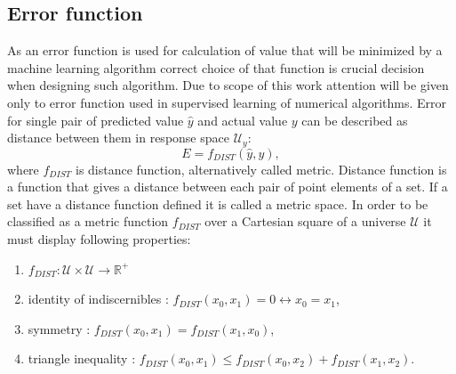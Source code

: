 \subsection{Error function}
As an error function is used for calculation of value that will be minimized by a machine 
learning algorithm correct choice of that function is crucial decision when designing such
algorithm.
Due to scope of this work attention will be given only to error function used in supervised 
learning of numerical algorithms.
Error for single pair of predicted value $\hat{y}$ and actual value $y$ can be described as
distance between them in response space $\mathcal{U}_{y}$:
\begin{equation}
	\label{equ:dist_general}
	E = f_{DIST}(\hat{y},y),
\end{equation}
where $f_{DIST}$ is distance function, alternatively called metric.
Distance function is a function that gives a distance between each pair of point elements of a set.
If a set have a distance function defined it is called a metric space. 
In order to be classified as a metric function $f_{DIST}$ over a Cartesian square of a universe 
$\mathcal{U}$ it must display following properties:
\begin{enumerate}
	\item $f_{DIST} : \mathcal{U} \times \mathcal{U} \to \mathbb{R}^{+}$
	\item identity of indiscernibles : $f_{DIST}(x_{0}, x_{1})=0 \leftrightarrow x_{0} = x_{1}$,
	\item symmetry : $f_{DIST}(x_{0},x_{1})=f_{DIST}(x_{1},x_{0})$,
	\item triangle inequality : $f_{DIST}(x_{0},x_{1}) \leq f_{DIST}(x_{0},x_{2}) +
		f_{DIST}(x_{1},x_{2})$. 
\end{enumerate}

